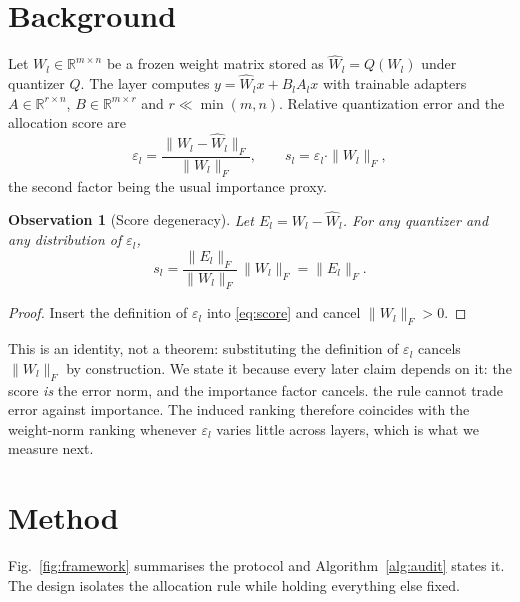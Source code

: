 \documentclass[preprint,12pt]{elsarticle}
\newtheorem{observation}{Observation}
\begin{document}
\section{Background}
\label{sec:background}

Let $W_l \in \mathbb{R}^{m \times n}$ be a frozen weight matrix stored as $\hat{W}_l = Q(W_l)$ under quantizer $Q$. The layer computes $y = \hat{W}_l x + B_l A_l x$ with trainable adapters $A \in \mathbb{R}^{r \times n}$, $B \in \mathbb{R}^{m \times r}$ and $r \ll \min(m,n)$. Relative quantization error and the allocation score are
\begin{equation}
    \varepsilon_l = \frac{\|W_l - \hat{W}_l\|_F}{\|W_l\|_F},
    \qquad
    s_l = \varepsilon_l \cdot \|W_l\|_F ,
    \label{eq:score}
\end{equation}
the second factor being the usual importance proxy.

\begin{observation}[Score degeneracy]
\label{prop:degeneracy}
Let $E_l = W_l - \hat{W}_l$. For any quantizer and any distribution of $\varepsilon_l$,
\begin{equation}
    s_l = \frac{\|E_l\|_F}{\|W_l\|_F}\,\|W_l\|_F = \|E_l\|_F .
    \label{eq:degeneracy}
\end{equation}
\end{observation}

\begin{proof}
Insert the definition of $\varepsilon_l$ into \eqref{eq:score} and cancel $\|W_l\|_F > 0$.
\end{proof}

This is an identity, not a theorem: substituting the definition of $\varepsilon_l$ cancels $\|W_l\|_F$ by construction. We state it because every later claim depends on it: the score \emph{is} the error norm, and the importance factor cancels. the rule cannot trade error against importance. The induced ranking therefore coincides with the weight-norm ranking whenever $\varepsilon_l$ varies little across layers, which is what we measure next.

\section{Method}
\label{sec:method}

Fig.~\ref{fig:framework} summarises the protocol and Algorithm~\ref{alg:audit} states it. The design isolates the allocation rule while holding everything else fixed.
\end{document}
